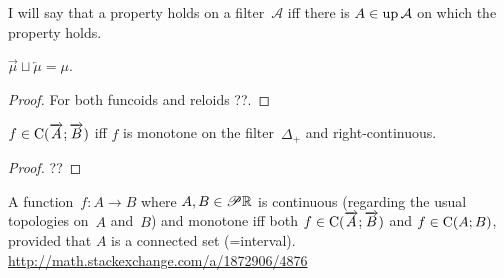 
I will say that a property holds on a filter~$\mathcal{A}$ iff there is $A\in\operatorname{up}\mathcal{A}$ on which the property holds.

\begin{prop}
$\overrightarrow{\mu} \sqcup \overleftarrow{\mu} = \mu$.
\end{prop}

\begin{proof}
For both funcoids and reloids ??.
\end{proof}

\begin{prop}
$f\in\mathrm{C}(\overrightarrow{A};\overrightarrow{B})$ iff
$f$ is monotone on the filter~$\Delta_+$ and right-continuous.
\end{prop}

\begin{proof}
??
\end{proof}

\begin{conjecture}
A function~$f:A\rightarrow B$ where $A,B\in\mathscr{P}\mathbb{R}$ is continuous (regarding the usual topologies on~$A$ and~$B$) and monotone iff
both $f\in\mathrm{C}(\overrightarrow{A};\overrightarrow{B})$ and $f\in\mathrm{C}(A;B)$, provided that $A$ is a connected set (=interval).
\url{http://math.stackexchange.com/a/1872906/4876}
\end{conjecture}

